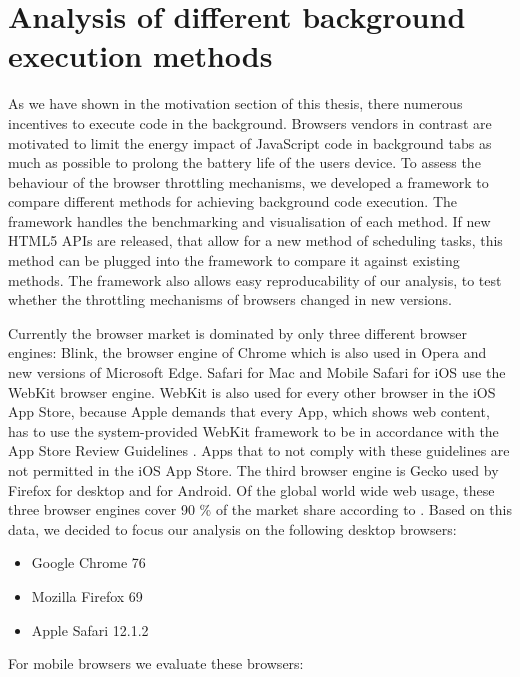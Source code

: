 \documentclass[
	ruledheaders=section,%
	class=report,%
	thesis={type=bachelor},%
	accentcolor=9c,%
	custommargins=true,%
	marginpar=false,%
	parskip=half-,%
	fontsize=11pt,%
]{tudapub}
\begin{document}
  
  \newpage
  \chapter{Analysis of different background execution methods}
  \label{chap:analysis}

  As we have shown in the motivation section of this thesis, there numerous incentives to execute code in the background. Browsers vendors in contrast are motivated to limit the energy impact of JavaScript code in background tabs as much as possible to prolong the battery life of the users device. To assess the behaviour of the browser throttling mechanisms, we developed a framework to compare different methods for achieving background code execution. The framework handles the benchmarking and visualisation of each method. If new HTML5 APIs are released, that allow for a new method of scheduling tasks, this method can be plugged into the framework to compare it against existing methods. The framework also allows easy reproducability of our analysis, to test whether the throttling mechanisms of browsers changed in new versions.

  Currently the browser market is dominated by only three different browser engines: Blink, the browser engine of Chrome which is also used in Opera and new versions of Microsoft Edge. Safari for Mac and Mobile Safari for iOS use the WebKit browser engine. WebKit is also used for every other browser in the iOS App Store, because Apple demands that every App, which shows web content, has to use the system-provided WebKit framework to be in accordance with the App Store Review Guidelines \cite{apple-app-review-guideline}. Apps that to not comply with these guidelines are not permitted in the iOS App Store. The third browser engine is Gecko used by Firefox for desktop and for Android. Of the global world wide web usage, these three browser engines cover 90 \% of the market share according to \cite{statcounter-global-browser-market-share}. Based on this data, we decided to focus our analysis on the following desktop browsers:

  \begin{itemize}
  \item Google Chrome 76
  \item Mozilla Firefox 69
  \item Apple Safari 12.1.2
  \end{itemize}

  For mobile browsers we evaluate these browsers:
\end{document}
